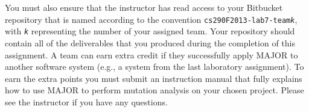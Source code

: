 You must also ensure that the instructor has read access to your Bitbucket repository that is named according to the
convention {\tt cs290F2013-lab7-team{\em k}}, with {\tt {\em k}} representing the number of your assigned team.  Your
repository should contain all of the deliverables that you produced during the completion of this assignment.  A team
can earn extra credit if they successfully apply MAJOR to another software system (e.g., a system from the last
laboratory assignment). To earn the extra points you must submit an instruction manual that fully explains how to use
MAJOR to perform mutation analysis on your chosen project. Please see the instructor if you have any questions. 
 



